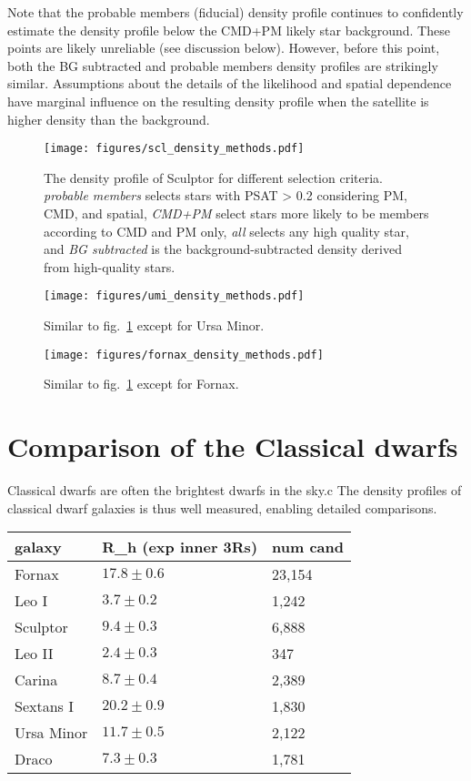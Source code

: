 Note that the probable members (fiducial) density profile continues to
confidently estimate the density profile below the CMD+PM likely star
background. These points are likely unreliable (see discussion below).
However, before this point, both the BG subtracted and probable members
density profiles are strikingly similar. Assumptions about the details
of the likelihood and spatial dependence have marginal influence on the
resulting density profile when the satellite is higher density than the
background.

\begin{figure}
\centering
\texttt{[image: figures/scl\_density\_methods.pdf]}
\caption[Sculptor density profiles]{The density profile of Sculptor for
different selection criteria. \emph{probable members} selects stars with
PSAT \textgreater{} 0.2 considering PM, CMD, and spatial, \emph{CMD+PM}
select stars more likely to be members according to CMD and PM only,
\emph{all} selects any high quality star, and \emph{BG subtracted} is
the background-subtracted density derived from high-quality
stars.}\label{fig:scl_observed_profiles}
\end{figure}

\begin{figure}
\centering
\texttt{[image: figures/umi\_density\_methods.pdf]}
\caption[Ursa Minor density profiles]{Similar to
fig.~\ref{fig:scl_observed_profiles} except for Ursa
Minor.}\label{fig:umi_observed_profiles}
\end{figure}

\begin{figure}
\centering
\texttt{[image: figures/fornax\_density\_methods.pdf]}
\caption[Fornax density profiles]{Similar to
fig.~\ref{fig:scl_observed_profiles} except for
Fornax.}\label{fig:fornax_observed_profiles}
\end{figure}

\section{Comparison of the Classical
dwarfs}\label{comparison-of-the-classical-dwarfs}

Classical dwarfs are often the brightest dwarfs in the sky.c The density
profiles of classical dwarf galaxies is thus well measured, enabling
detailed comparisons.

\begin{table*}[t]
\centering
\begin{tabular}{lll}
\toprule
galaxy & R\_h (exp inner 3Rs) & num cand\\
\midrule
Fornax & $17.8\pm0.6$ & 23,154\\
Leo I & $3.7\pm0.2$ & 1,242\\
Sculptor & $9.4\pm0.3$ & 6,888\\
Leo II & $2.4\pm0.3$ & 347\\
Carina & $8.7\pm0.4$ & 2,389\\
Sextans I & $20.2 \pm0.9$ & 1,830\\
Ursa Minor & $11.7 \pm 0.5$ & 2,122\\
Draco & $7.3\pm0.3$ & 1,781\\
\bottomrule
\end{tabular}
\end{table*}

